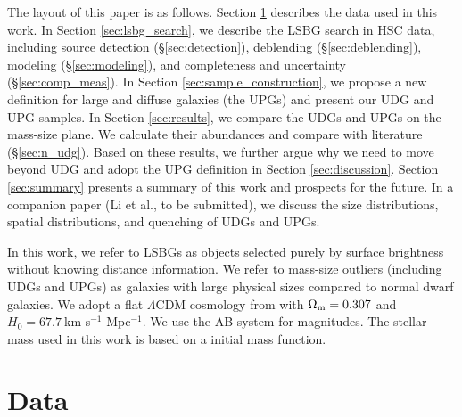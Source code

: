 \documentclass[twocolumn,astrosymb,twocolappendix]{aastex631}
\begin{document}
\begin{CJK*}{UTF8}{gbsn}

The layout of this paper is as follows. Section \ref{sec:data} describes the data used in this work. In Section \ref{sec:lsbg_search}, we describe the LSBG search in HSC data, including source detection (\S \ref{sec:detection}), deblending (\S \ref{sec:deblending}), modeling (\S \ref{sec:modeling}), and completeness and uncertainty (\S\ref{sec:comp_meas}). In Section \ref{sec:sample_construction}, we propose a new definition for large and diffuse galaxies (the UPGs) and present our UDG and UPG samples. In Section \ref{sec:results}, we compare the UDGs and UPGs on the mass-size plane. We calculate their abundances and compare with literature (\S \ref{sec:n_udg}). Based on these results, we further argue why we need to move beyond UDG and adopt the UPG definition in Section \ref{sec:discussion}. Section \ref{sec:summary} presents a summary of this work and prospects for the future. In a companion paper (Li et al., to be submitted), we discuss the size distributions, spatial distributions, and quenching of UDGs and UPGs. 

In this work, we refer to LSBGs as objects selected purely by surface brightness without knowing distance information. We refer to mass-size outliers (including UDGs and UPGs) as galaxies with large physical sizes compared to normal dwarf galaxies. We adopt a flat $\Lambda$CDM cosmology from \citet{Planck15} with $\Omega_{\rm m}= 0.307$ and $H_0 = 67.7\ $km s$^{-1}$ Mpc$^{-1}$. We use the AB system \citep{Oke1983} for magnitudes. The stellar mass used in this work is based on a \citet{Chabrier2003} initial mass function.


\section{Data} \label{sec:data}

\end{CJK*}
\end{document}

